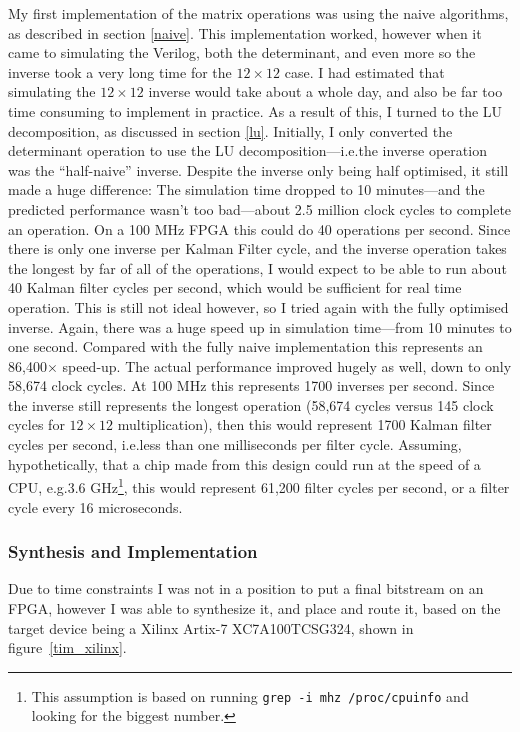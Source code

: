 \documentclass[12pt]{article}
\begin{document}
My first implementation of the matrix operations was using the naive algorithms, as described in section \ref{naive}. This implementation worked, however when it came to simulating the Verilog, both the determinant, and even more so the inverse took a very long time for the $12 \times 12$ case. I had estimated that simulating the $12 \times 12$ inverse would take about a whole day, and also be far too time consuming to implement in practice. As a result of this, I turned to the LU decomposition, as discussed in section \ref{lu}. Initially, I only converted the determinant operation to use the LU decomposition---i.e.\@ the inverse operation was the ``half-naive'' inverse. Despite the inverse only being half optimised, it still made a huge difference: The simulation time dropped to 10 minutes---and the predicted performance wasn't too bad---about 2.5 million clock cycles to complete an operation. On a 100 MHz FPGA this could do 40 operations per second. Since there is only one inverse per Kalman Filter cycle, and the inverse operation takes the longest by far of all of the operations, I would expect to be able to run about 40 Kalman filter cycles per second, which would be sufficient for real time operation. This is still not ideal however, so I tried again with the fully optimised inverse. Again, there was a huge speed up in simulation time---from 10 minutes to one second. Compared with the fully naive implementation this represents an 86,400$\times$ speed-up. The actual performance improved hugely as well, down to only 58,674 clock cycles. At 100 MHz this represents 1700 inverses per second. Since the inverse still represents the longest operation (58,674 cycles versus 145 clock cycles for $12\times12$ multiplication), then this would represent 1700 Kalman filter cycles per second, i.e.\@ less than one milliseconds per filter cycle. Assuming, hypothetically, that a chip made from this design could run at the speed of a CPU, e.g.\@ 3.6 GHz\footnote{This assumption is based on running \lstinline|grep -i mhz /proc/cpuinfo| and looking for the biggest number.}, this would represent 61,200 filter cycles per second, or a filter cycle every 16 microseconds.

\subsubsection{Synthesis and Implementation}

Due to time constraints I was not in a position to put a final bitstream on an FPGA, however I was able to synthesize it, and place and route it, based on the target device being a Xilinx Artix-7 XC7A100TCSG324, shown in figure~\ref{tim_xilinx}.
\end{document}
